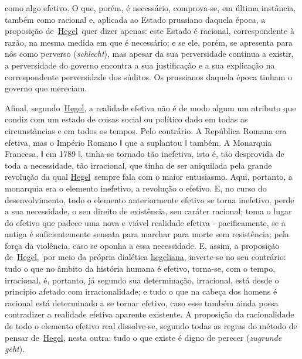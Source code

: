 como algo efetivo. O que, porém, é necessário, comprova-se, em última
instância, também como racional e, aplicada ao Estado prussiano daquela
época, a proposição
de~\href{https://www.marxists.org/portugues/dicionario/verbetes/h/hegel.htm}{Hegel}~quer
dizer apenas: este Estado é racional, correspondente à razão, na mesma
medida em que é necessário; e se ele, porém, se apresenta para nós como
perverso (\emph{schlecht}), mas apesar da sua perversidade continua a
existir, a perversidade do governo encontra a sua justificação e a sua
explicação na correspondente perversidade dos súditos. Os prussianos
daquela época tinham o governo que mereciam.

Afinal,
segundo~\href{https://www.marxists.org/portugues/dicionario/verbetes/h/hegel.htm}{Hegel},
a realidade efetiva não é de modo algum um atributo que condiz com um
estado de coisas social ou político dado em todas as circunstâncias e em
todos os tempos. Pelo contrário. A República Romana era efetiva, mas o
Império Romano ǁ que a suplantou ǁ também. A Monarquia Francesa, ǁ em
1789 ǁ, tinha-se tornado tão inefetiva, isto é, tão desprovida de toda a
necessidade, tão irracional, que tinha de ser aniquilada pela grande
revolução da qual
\href{https://www.marxists.org/portugues/dicionario/verbetes/h/hegel.htm}{Hegel}~sempre
fala com o maior entusiasmo. Aqui, portanto, a monarquia era o elemento
inefetivo, a revolução o efetivo. E, no curso do desenvolvimento, todo o
elemento anteriormente efetivo se torna inefetivo, perde a sua
necessidade, o seu direito de existência, seu caráter racional; toma o
lugar do efetivo que padece uma nova e viável realidade efetiva -
pacificamente, se a antiga é suficientemente sensata para marchar para
morte sem resistência; pela força da violência, caso se oponha a essa
necessidade. E, assim, a proposição
de~\href{https://www.marxists.org/portugues/dicionario/verbetes/h/hegel.htm}{Hegel},~por
meio da própria dialética
\href{https://www.marxists.org/portugues/dicionario/verbetes/h/hegel.htm}{hegeliana},
inverte-se no seu contrário: tudo o que no âmbito da história humana é
efetivo, torna-se, com o tempo, irracional, é, portanto, já segundo sua
determinação, irracional, está desde o principio afetado com
irracionalidade; e tudo o que na cabeça dos homens é racional está
determinado a se tornar efetivo, caso esse também ainda possa
contradizer a realidade efetiva aparente existente. A proposição da
racionalidade de todo o elemento efetivo real dissolve-se, segundo todas
as regras do método de pensar
de~\href{https://www.marxists.org/portugues/dicionario/verbetes/h/hegel.htm}{Hegel},
nesta outra: tudo o que existe é digno de perecer (\emph{zugrunde
geht}).\protect\hypertarget{r5}{}{}

